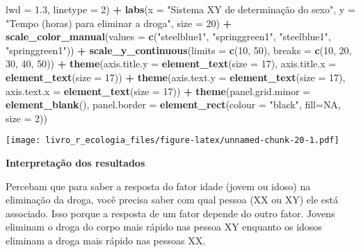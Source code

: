 \documentclass[
]{book}
\newenvironment{Shaded}{\begin{snugshade}}{\end{snugshade}}
\newcommand{\DataTypeTok}[1]{\textcolor[rgb]{0.13,0.29,0.53}{#1}}
\newcommand{\DecValTok}[1]{\textcolor[rgb]{0.00,0.00,0.81}{#1}}
\newcommand{\FloatTok}[1]{\textcolor[rgb]{0.00,0.00,0.81}{#1}}
\newcommand{\KeywordTok}[1]{\textcolor[rgb]{0.13,0.29,0.53}{\textbf{#1}}}
\newcommand{\NormalTok}[1]{#1}
\newcommand{\OperatorTok}[1]{\textcolor[rgb]{0.81,0.36,0.00}{\textbf{#1}}}
\newcommand{\OtherTok}[1]{\textcolor[rgb]{0.56,0.35,0.01}{#1}}
\newcommand{\StringTok}[1]{\textcolor[rgb]{0.31,0.60,0.02}{#1}}
\begin{document}
\begin{Shaded}
\begin{Highlighting}[]
            \DataTypeTok{lwd  =} \FloatTok{1.3}\NormalTok{, }\DataTypeTok{linetype =} \DecValTok{2}\NormalTok{) }\OperatorTok{+}\StringTok{ }
\StringTok{  }\KeywordTok{labs}\NormalTok{(}\DataTypeTok{x =} \StringTok{"Sistema XY de determinação do sexo"}\NormalTok{, }\DataTypeTok{y =} \StringTok{"Tempo (horas) para eliminar a droga"}\NormalTok{, }
       \DataTypeTok{size =} \DecValTok{20}\NormalTok{) }\OperatorTok{+}
\StringTok{  }\KeywordTok{scale_color_manual}\NormalTok{(}\DataTypeTok{values =} \KeywordTok{c}\NormalTok{(}\StringTok{"steelblue1"}\NormalTok{, }\StringTok{"springgreen1"}\NormalTok{, }\StringTok{"steelblue1"}\NormalTok{, }
                                \StringTok{"springgreen1"}\NormalTok{)) }\OperatorTok{+}
\StringTok{  }\KeywordTok{scale_y_continuous}\NormalTok{(}\DataTypeTok{limits =} \KeywordTok{c}\NormalTok{(}\DecValTok{10}\NormalTok{, }\DecValTok{50}\NormalTok{), }\DataTypeTok{breaks =} \KeywordTok{c}\NormalTok{(}\DecValTok{10}\NormalTok{, }\DecValTok{20}\NormalTok{, }\DecValTok{30}\NormalTok{, }\DecValTok{40}\NormalTok{, }\DecValTok{50}\NormalTok{)) }\OperatorTok{+}
\StringTok{  }\KeywordTok{theme}\NormalTok{(}\DataTypeTok{axis.title.y =} \KeywordTok{element_text}\NormalTok{(}\DataTypeTok{size =} \DecValTok{17}\NormalTok{), }\DataTypeTok{axis.title.x =} \KeywordTok{element_text}\NormalTok{(}\DataTypeTok{size =} \DecValTok{17}\NormalTok{)) }\OperatorTok{+}
\StringTok{  }\KeywordTok{theme}\NormalTok{(}\DataTypeTok{axis.text.y =} \KeywordTok{element_text}\NormalTok{(}\DataTypeTok{size =} \DecValTok{17}\NormalTok{), }\DataTypeTok{axis.text.x =} \KeywordTok{element_text}\NormalTok{(}\DataTypeTok{size =} \DecValTok{17}\NormalTok{)) }\OperatorTok{+}
\StringTok{  }\KeywordTok{theme}\NormalTok{(}\DataTypeTok{panel.grid.minor =} \KeywordTok{element_blank}\NormalTok{(), }
        \DataTypeTok{panel.border =} \KeywordTok{element_rect}\NormalTok{(}\DataTypeTok{colour =} \StringTok{"black"}\NormalTok{, }\DataTypeTok{fill=}\OtherTok{NA}\NormalTok{, }\DataTypeTok{size =} \DecValTok{2}\NormalTok{))}
\end{Highlighting}
\end{Shaded}

\texttt{[image: livro\_r\_ecologia\_files/figure-latex/unnamed-chunk-20-1.pdf]}

\textbf{Interpretação dos resultados}

Percebam que para saber a resposta do fator idade (jovem ou idoso) na eliminação da droga, você precisa saber com qual pessoa (XX ou XY) ele está associado. Isso porque a resposta de um fator depende do outro fator. Jovens eliminam o droga do corpo mais rápido nas pessoa XY enquanto os idosos eliminam a droga mais rápido nas pessoas XX.
\end{document}

